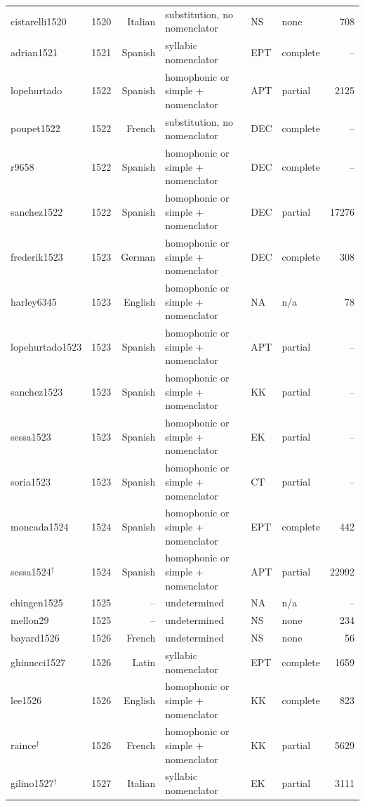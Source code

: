 {\begin{longtable}{@{}llrlllr@{}}
cistarelli1520 & 1520 & Italian & substitution, no nomenclator & NS & none & 708 \\
adrian1521 & 1521 & Spanish & syllabic nomenclator & EPT & complete & -- \\
lopehurtado & 1522 & Spanish & homophonic or simple + nomenclator & APT & partial & 2125 \\
poupet1522 & 1522 & French & substitution, no nomenclator & DEC & complete & -- \\
r9658 & 1522 & Spanish & homophonic or simple + nomenclator & DEC & complete & -- \\
sanchez1522 & 1522 & Spanish & homophonic or simple + nomenclator & DEC & partial & 17276 \\
frederik1523 & 1523 & German & homophonic or simple + nomenclator & DEC & complete & 308 \\
harley6345 & 1523 & English & homophonic or simple + nomenclator & NA & n/a & 78 \\
lopehurtado1523 & 1523 & Spanish & homophonic or simple + nomenclator & APT & partial & -- \\
sanchez1523 & 1523 & Spanish & homophonic or simple + nomenclator & KK & partial & -- \\
sessa1523 & 1523 & Spanish & homophonic or simple + nomenclator & EK & partial & -- \\
soria1523 & 1523 & Spanish & homophonic or simple + nomenclator & CT & partial & -- \\
moncada1524 & 1524 & Spanish & homophonic or simple + nomenclator & EPT & complete & 442 \\
sessa1524$^\dagger$ & 1524 & Spanish & homophonic or simple + nomenclator & APT & partial & 22992 \\
ehingen1525 & 1525 & -- & undetermined & NA & n/a & -- \\
mellon29 & 1525 & -- & undetermined & NS & none & 234 \\
bayard1526 & 1526 & French & undetermined & NS & none & 56 \\
ghinucci1527 & 1526 & Latin & syllabic nomenclator & EPT & complete & 1659 \\
lee1526 & 1526 & English & homophonic or simple + nomenclator & KK & complete & 823 \\
raince$^\dagger$ & 1526 & French & homophonic or simple + nomenclator & KK & partial & 5629 \\
gilino1527$^\dagger$ & 1527 & Italian & syllabic nomenclator & EK & partial & 3111 \\

\end{longtable}}
